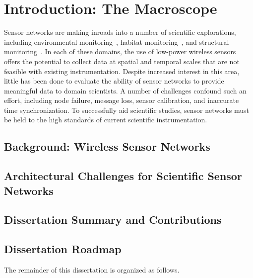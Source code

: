 \chapter{Introduction: The Macroscope} 
\label{chap-introduction}


Sensor networks are making inroads into a number of scientific explorations,
including environmental monitoring~\cite{rope-emnets05,berkeley-redwoods},
habitat monitoring~\cite{cerpa-habitat,mainwaring-habitat,gdi-sensys04}, and
structural monitoring~\cite{ggb-monitoring,netshm-emnets05,wisan}.  In each
of these domains, the use of low-power wireless sensors offers the potential
to collect data at spatial and temporal scales that are not feasible with
existing instrumentation.  Despite increased interest in this area, little
has been done to evaluate the ability of sensor networks to provide
meaningful data to domain scientists. A number of challenges confound such an
effort, including node failure, message loss, sensor calibration, and
inaccurate time synchronization. To successfully aid scientific studies,
sensor networks must be held to the high standards of 
current scientific instrumentation.

\section{Background: Wireless Sensor Networks}

\section{Architectural Challenges for Scientific Sensor Networks}

\section{Dissertation Summary and Contributions}

\section{Dissertation Roadmap}

The remainder of this dissertation is organized as follows.

